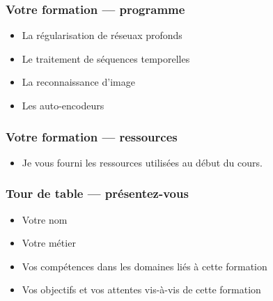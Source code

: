 \documentclass{formation}
\begin{document}
\begin{frame}
  \frametitle{Votre formation — programme}
  \begin{itemize}
  \item La régularisation de réseuax profonds
  \item Le traitement de séquences temporelles
  \item La reconnaissance d'image
  \item Les auto-encodeurs
  \end{itemize}
\end{frame}

\begin{frame}
  \frametitle{Votre formation — ressources}
  \begin{itemize}
  \item Je vous fourni les ressources utilisées au début du cours.
  \end{itemize}
\end{frame}

\begin{frame}
  \frametitle{Tour de table — présentez-vous}
  \begin{itemize}
  \item Votre nom
  \item Votre métier
  \item Vos compétences dans les domaines liés à cette formation
  \item Vos objectifs et vos attentes vis-à-vis de cette formation
  \end{itemize}
\end{frame}
\end{document}

